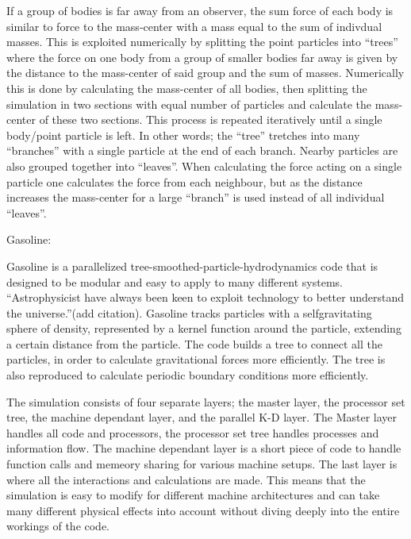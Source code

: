 If a group of bodies is far away from an observer, the sum force of each body is similar to force to the mass-center with a mass equal to the sum of indivdual masses.
This is exploited numerically by splitting the point particles into ``trees'' where the force on one body from a group of smaller bodies far away is given by the distance to the mass-center of said group and the sum of masses.
Numerically this is done by calculating the mass-center of all bodies, then splitting the simulation in two sections with equal number of particles and calculate the mass-center of these two sections. This process is repeated iteratively until a single body/point particle is left. In other words; the ``tree'' tretches into many ``branches'' with a single particle at the end of each branch. Nearby particles are also grouped together into ``leaves''.
When calculating the force acting on a single particle one calculates the force from each neighbour, but as the distance increases the mass-center for a large ``branch'' is used instead of all individual ``leaves''.

Gasoline:

Gasoline is a parallelized tree-smoothed-particle-hydrodynamics code that is designed to be modular and easy to apply to many different systems.
``Astrophysicist have always been keen to exploit technology to better understand the universe.''(add citation).
Gasoline tracks particles with a selfgravitating sphere of density, represented by a kernel function around the particle, extending a certain distance from the particle.
The code builds a tree to connect all the particles, in order to calculate gravitational forces more efficiently. The tree is also reproduced to calculate periodic boundary conditions more efficiently.

The simulation consists of four separate layers; the master layer, the processor set tree, the machine dependant layer, and the parallel K-D layer. The Master layer handles all code and processors, the processor set tree handles processes and information flow. The machine dependant layer is a short piece of code to handle function calls and memeory sharing for various machine setups. The last layer is where all the interactions and calculations are made. This means that the simulation is easy to modify for different machine architectures and can take many different physical effects into account without diving deeply into the entire workings of the code.

